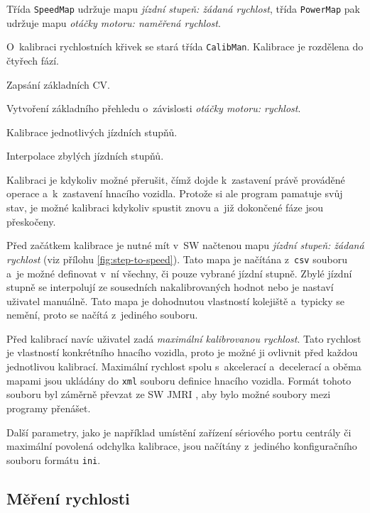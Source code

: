 Třída \texttt{SpeedMap} udržuje mapu \textit{jízdní stupeň: žádaná rychlost},
třída \texttt{Power\-Map} pak udržuje mapu \textit{otáčky motoru: naměřená rychlost}.

O~kalibraci rychlostních křivek se stará třída \texttt{CalibMan}. Kalibrace
je rozdělena do čtyřech fází.

\begin{compactenum}
\item Zapsání základních \gls{CV}.
\item Vytvoření základního přehledu o~závislosti \textit{otáčky motoru: rychlost}.
\item Kalibrace jednotlivých jízdních stupňů.
\item Interpolace zbylých jízdních stupňů.
\end{compactenum}

Kalibraci je kdykoliv možné přerušit, čímž dojde k~zastavení právě prováděné
operace a~k~zastavení hnacího vozidla. Protože si ale program pamatuje svůj
stav, je možné kalibraci kdykoliv spustit znovu a~již dokončené fáze jsou
přeskočeny.

Před začátkem kalibrace je nutné mít v~SW načtenou mapu \textit{jízdní
stupeň: žádaná rychlost} (viz přílohu \ref{fig:step-to-speed}). Tato mapa je
načítána z~\texttt{csv} souboru a~je možné definovat v~ní všechny, či pouze
vybrané jízdní stupně. Zbylé jízdní stupně se interpolují ze sousedních
nakalibrovaných hodnot nebo je nastaví uživatel manuálně. Tato mapa je
dohodnutou vlastností kolejiště a~typicky se nemění, proto se načítá z~jediného
souboru.

Před kalibrací navíc uživatel zadá \textit{maximální kalibrovanou rychlost}.
Tato rychlost je vlastností konkrétního hnacího vozidla, proto je možné ji
ovlivnit před každou jednotlivou kalibrací. Maximální rychlost spolu
s~akcelerací a~decelerací a oběma mapami jsou ukládány do \texttt{xml} souboru
definice hnacího vozidla. Formát tohoto souboru byl záměrně převzat ze SW JMRI
\cite{jmri:web}, aby bylo možné soubory mezi programy přenášet.

Další parametry, jako je například umístění zařízení sériového portu centrály
či maximální povolená odchylka kalibrace, jsou načítány z~jediného
konfiguračního souboru formátu \texttt{ini}.

\subsection{Měření rychlosti}
\label{sec:ac:lt-measure}

